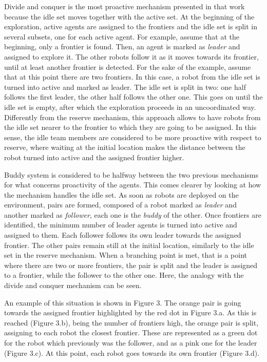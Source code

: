 Divide and conquer is the most proactive mechanism presented in that
work because the idle set moves together with the active set. At the
beginning of the exploration, active agents are assigned to the frontiers
and the idle set is split in several subsets, one for each active
agent. For example, assume that at the beginning, only a frontier
is found. Then, an agent is marked as \emph{leader }and assigned to
explore it. The other robots follow it as it moves towards its frontier,
until at least another frontier is detected. For the sake of the example,
assume that at this point there are two frontiers. In this case, a
robot from the idle set is turned into active and marked as leader.
The idle set is split in two: one half follows the first leader, the
other half follows the other one. This goes on until the idle set
is empty, after which the exploration proceeds in an uncoordinated
way. Differently from the reserve mechanism, this approach allows
to have robots from the idle set nearer to the frontier to which they
are going to be assigned. In this sense, the idle team members are
considered to be more proactive with respect to reserve, where waiting
at the initial location makes the distance between the robot turned
into active and the assigned frontier higher. 

Buddy system is considered to be halfway between the two previous
mechanisms for what concerns proactivity of the agents. This comes
clearer by looking at how the mechanism handles the idle set. As soon
as robots are deployed on the environment, pairs are formed, composed
of a robot marked as \emph{leader} and another marked as \emph{follower},
each one is the \emph{buddy} of the other. Once frontiers are identified,
the minimum number of leader agents is turned into active and assigned
to them. Each follower follows its own leader towards the assigned
frontier. The other pairs remain still at the initial location, similarly
to the idle set in the reserve mechanism. When a branching point is
met, that is a point where there are two or more frontiers, the pair
is split and the leader is assigned to a frontier, while the follower
to the other one. Here, the analogy with the divide and conquer mechanism
can be seen. 

An example of this situation is shown in Figure 3. The orange pair
is going towards the assigned frontier highlighted by the red dot
in Figure 3.a. As this is reached (Figure 3.b), being the number of
frontiers high, the orange pair is split, assigning to each robot
the closest frontier. These are represented as a green dot for the
robot which previously was the follower, and as a pink one for the
leader (Figure 3.c). At this point, each robot goes towards its own
frontier (Figure 3.d). 

